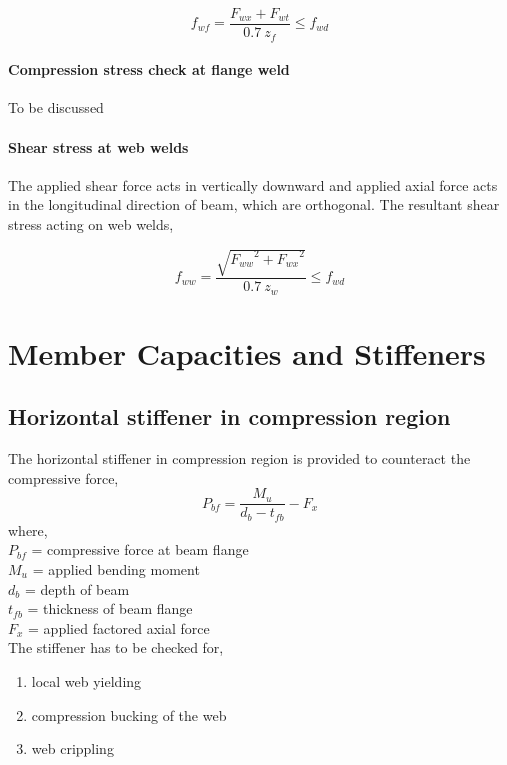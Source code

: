 \documentclass[11.5pt,a4paper,oneside]{report}
\begin{document}
\begin{Form}
\begin{equation}
	f_{wf} = \frac{F_{wx} + F_{wt}}{0.7~z_f} \leq f_{wd}
\end{equation}

\subsubsection{Compression stress check at flange weld}
To be discussed

\subsubsection{Shear stress at web welds}
The applied shear force acts in vertically downward and 
applied axial force acts in the longitudinal direction of beam,
which are orthogonal. 
The resultant shear stress acting on web welds,

\begin{equation}
	f_{ww} = \frac{\sqrt{{F_{ww}}^2 + {F_{wx}}^2}}{0.7~z_w} \leq f_{wd}
\end{equation}


\chapter{Member Capacities and Stiffeners}
\section{Horizontal stiffener in compression region}
The horizontal stiffener in compression region is provided to counteract
the compressive force, 
\begin{equation}
	P_{bf} = \frac{M_u}{d_b - t_{fb}} - F_x
\end{equation}
where, \\
\indent $P_{bf}$ = compressive force at beam flange \\ 
\indent ${M_u}$ = applied bending moment \\ 
\indent $d_b$ = depth of beam \\
\indent $t_{fb}$ = thickness of beam flange \\
\indent $F_x$ = applied factored axial force \\

The stiffener has to be checked for, 
\begin{enumerate}[label=(\alph*)]
	\item local web yielding
	\item compression bucking of the web
	\item web crippling
\end{enumerate}



\end{Form}
\end{document}
